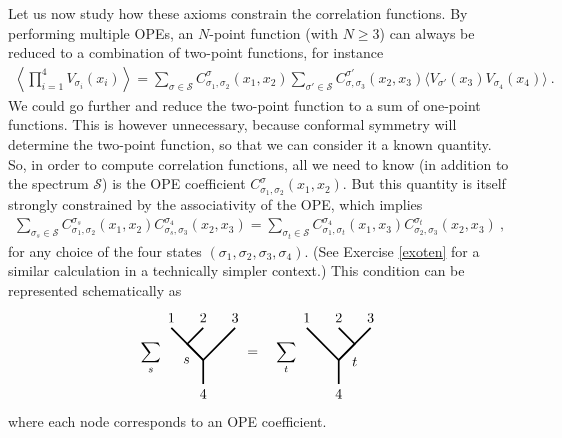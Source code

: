 \documentclass[12pt, a4paper, notitlepage, twoside]{report}
\numberwithin{equation}{section}
\theoremstyle{break}
\begin{document}
Let us now study how these axioms constrain the correlation functions.
By performing multiple OPEs, an $N$-point function (with $N\geq 3$) can always be reduced to a combination of two-point functions, for instance
\begin{align}
 \left\langle \prod_{i=1}^4 V_{\sigma_i}(x_i) \right\rangle = \sum_{\sigma\in \mathcal{S}} C_{\sigma_1,\sigma_2}^{\sigma}(x_1,x_2)\sum_{\sigma'\in \mathcal{S}} C_{\sigma,\sigma_3}^{\sigma'}(x_2,x_3)\Big\langle V_{\sigma'}(x_3)V_{\sigma_4}(x_4)\Big\rangle\ .
\end{align}
We could go further and reduce the two-point function to a sum of one-point functions.
This is however unnecessary, because conformal symmetry will determine the two-point function, so that we can consider it a known quantity.
So, in order to compute correlation functions, all we need to know (in addition to the spectrum $\mathcal{S}$) is the OPE coefficient $C_{\sigma_1,\sigma_2}^{\sigma}(x_1,x_2)$.
But this quantity is itself strongly constrained by the associativity of the OPE, which implies
\begin{align}
 \sum_{\sigma_s\in \mathcal{S}} C_{\sigma_1,\sigma_2}^{\sigma_s}(x_1,x_2) C_{\sigma_s,\sigma_3}^{\sigma_4}(x_2,x_3) = \sum_{\sigma_t\in \mathcal{S}} C_{\sigma_1,\sigma_t}^{\sigma_4}(x_1,x_3)C_{\sigma_2,\sigma_3}^{\sigma_t}(x_2,x_3)\ ,
\label{cccc}
\end{align}
for any choice of the four states $(\sigma_1,\sigma_2,\sigma_3,\sigma_4)$.
(See Exercise \ref{exoten} for a similar calculation in a technically simpler context.) This condition can be represented schematically as 
\begin{align}
\sum_{s} 
 \begin{tikzpicture}[scale = .2, baseline=(current  bounding  box.center), very thick]
  \draw (-4,3) node [above] {$1$} -- (0, -1) -- (4, 3) node [above] {$3$};
  \draw (0, 3) node [above] {$2$} -- (-2, 1) -- node [below left] {$s$} (0, -1) -- (0, -4) node [below] {$4$};
 \end{tikzpicture}
= \quad
\sum_{t} 
\begin{tikzpicture}[scale = .2, baseline=(current  bounding  box.center), very thick]
  \draw (-4,3) node [above] {$1$} -- (0, -1) -- (4, 3) node [above] {$3$};
  \draw (0, 3) node [above] {$2$} -- (2, 1) -- node [below right] {$t$} (0, -1) -- (0, -4) node [below] {$4$};
  \end{tikzpicture}
\label{sdsd}
\end{align}
where each node corresponds to an OPE coefficient. 
\end{document}
